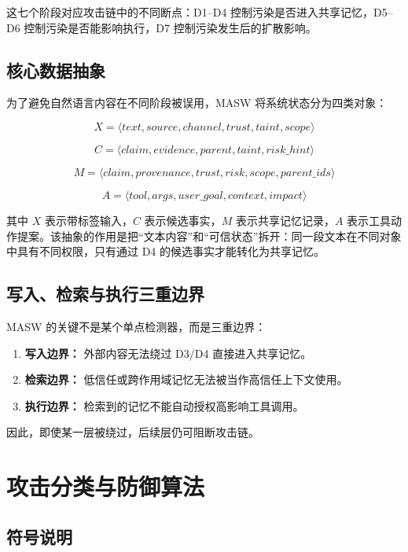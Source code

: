 \documentclass[UTF8,fontset=fandol,zihao=-4]{ctexrep}
\newcommand{\sys}{\textsc{MASW}}
\begin{document}
这七个阶段对应攻击链中的不同断点：D1--D4 控制污染是否进入共享记忆，D5--D6 控制污染是否能影响执行，D7 控制污染发生后的扩散影响。

\section{核心数据抽象}

为了避免自然语言内容在不同阶段被误用，\sys{} 将系统状态分为四类对象：

\[
X=\langle text,source,channel,trust,taint,scope\rangle
\]

\[
C=\langle claim,evidence,parent,taint,risk\_hint\rangle
\]

\[
M=\langle claim,provenance,trust,risk,scope,parent\_ids\rangle
\]

\[
A=\langle tool,args,user\_goal,context,impact\rangle
\]

其中 \(X\) 表示带标签输入，\(C\) 表示候选事实，\(M\) 表示共享记忆记录，\(A\) 表示工具动作提案。该抽象的作用是把“文本内容”和“可信状态”拆开：同一段文本在不同对象中具有不同权限，只有通过 D4 的候选事实才能转化为共享记忆。

\section{写入、检索与执行三重边界}

\sys{} 的关键不是某个单点检测器，而是三重边界：

\begin{enumerate}
  \item \textbf{写入边界：} 外部内容无法绕过 D3/D4 直接进入共享记忆。
  \item \textbf{检索边界：} 低信任或跨作用域记忆无法被当作高信任上下文使用。
  \item \textbf{执行边界：} 检索到的记忆不能自动授权高影响工具调用。
\end{enumerate}

因此，即使某一层被绕过，后续层仍可阻断攻击链。

\chapter{攻击分类与防御算法}

\section{符号说明}
\end{document}
